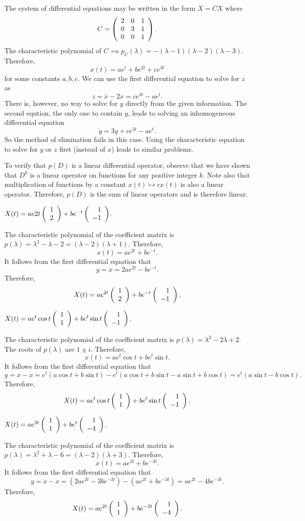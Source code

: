 \documentclass{ximera}
\begin{document}
The system of differential equations may be written in the form $\dot{X}=CX$ where
\[
C=\left(\begin{array}{rrr} 2 & 0 & 1 \\ 0 & 3 & 1 \\ 0 & 0 & 1\end{array}\right).
\]
The characteristic polynomial of $C$ =s
$p_C(\lambda)=-(\lambda-1)(\lambda-2)(\lambda-3)$.  Therefore, 
\[
x(t) = ae^t+be^{2t}+ce^{3t}
\]
for some constants $a,b,c$.  We can use the first differential equation to solve for
$z$ as
\[
z = \dot{x}-2x = ce^{3t}-ae^t.
\]
There is, however, no way to solve for $y$ directly from the given information.  The
second eqution, the only one to contain $y$, leads to solving an inhomogeneous
differential equation
\[
\dot{y} = 3y + ce^{3t}-ae^t.
\]
So the method of elimination fails in this case.  Using the characteristic equation
to solve for $y$ or $z$ first (instead of $x$) leads to similar problems. 


To verify that $p(D)$ is a linear differential operator, observe that we have shown 
that $D^k$ is a linear operator on functions for any positive integer $k$.  Note also
that multiplication of functions by a constant $x(t)\mapsto cx(t)$ is also a linear
operator.  Therefore, $p(D)$ is the sum of linear operators and is therefore linear.


 \ans $X(t) = ae{2t}\left(\begin{array}{r} 1 \\ 2\end{array}\right) + be^{-t}\left(\begin{array}{r} 1 \\ -1\end{array}\right)$.

\soln  The characteristic polynomial of the coefficient matrix is 
$p(\lambda) = \lambda^2-\lambda-2=(\lambda-2)(\lambda+1)$.  Therefore, 
\[
x(t) = ae^{2t}+be^{-t}.
\]
It follows from the first differential equation that 
\[
y = \dot{x} = 2ae^{2t}-be^{-t}.
\]
Therefore,
\[
X(t) = ae^{2t}\left(\begin{array}{r} 1 \\ 2\end{array}\right) + be^{-t}\left(\begin{array}{r} 1 \\ -1\end{array}\right).
\]


  \ans $X(t) = ae^t\cos t\left(\begin{array}{r} 1 \\ 1\end{array}\right) + be^t\sin t\left(\begin{array}{r} 1 \\ -1\end{array}\right)$.

\soln  The characteristic polynomial of the coefficient matrix is 
$p(\lambda) = \lambda^2-2\lambda+2$.  The roots of $p(\lambda)$ are $1\pm i$. 
Therefore, 
\[
x(t) = ae^t\cos t+be^t\sin t.
\]
It follows from the first differential equation that 
\[
y = x-\dot{x} = e^t(a\cos t+b\sin t) - e^t(a\cos t+b\sin t-a\sin t+b\cos t)
=e^t(a\sin t-b\cos t).
\]
Therefore,
\[
X(t) = ae^t\cos t\left(\begin{array}{r} 1 \\ 1\end{array}\right) + be^t\sin t\left(\begin{array}{r} 1 \\ -1\end{array}\right).
\]


 \ans $X(t) = ae^{2t}\left(\begin{array}{r} 1 \\ 1\end{array}\right) + be^t\left(\begin{array}{r} 1 \\ -4\end{array}\right)$.

\soln  The characteristic polynomial of the coefficient matrix is 
$p(\lambda) = \lambda^2+\lambda-6=(\lambda-2)(\lambda+3)$.  Therefore, 
\[
x(t) = ae^{2t}+be^{-3t}.
\]
It follows from the first differential equation that 
\[
y =\dot{x}-x = (2ae^{2t}-3be^{-3t})-(ae^{2t}+be^{-3t}) = ae^{2t}-4be^{-3t}.
\]
Therefore,
\[
X(t) = ae^{2t}\left(\begin{array}{r} 1 \\ 1\end{array}\right) + be^{-3t}\left(\begin{array}{r} 1 \\ -4\end{array}\right).
\]
\end{document}
